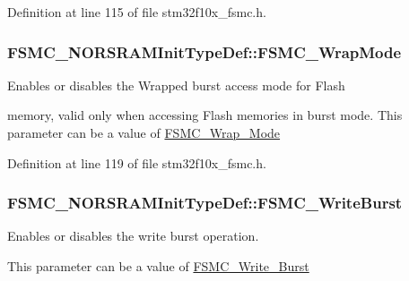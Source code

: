 Definition at line 115 of file stm32f10x\-\_\-fsmc.\-h.

\hypertarget{struct_f_s_m_c___n_o_r_s_r_a_m_init_type_def_a7e201c17bf7c5f6cc69fb6de29c8b024}{
\subsubsection[{F\-S\-M\-C\-\_\-\-Wrap\-Mode}]{ F\-S\-M\-C\-\_\-\-N\-O\-R\-S\-R\-A\-M\-Init\-Type\-Def\-::\-F\-S\-M\-C\-\_\-\-Wrap\-Mode}}\label{struct_f_s_m_c___n_o_r_s_r_a_m_init_type_def_a7e201c17bf7c5f6cc69fb6de29c8b024}
\begin{DoxyVerb}            Enables or disables the Wrapped burst access mode for Flash
\end{DoxyVerb}
 memory, valid only when accessing Flash memories in burst mode. This parameter can be a value of \hyperlink{group___f_s_m_c___wrap___mode}{F\-S\-M\-C\-\_\-\-Wrap\-\_\-\-Mode} 

Definition at line 119 of file stm32f10x\-\_\-fsmc.\-h.

\hypertarget{struct_f_s_m_c___n_o_r_s_r_a_m_init_type_def_adac3756711f2d76e56a8cbcb7a03843d}{
\subsubsection[{F\-S\-M\-C\-\_\-\-Write\-Burst}]{ F\-S\-M\-C\-\_\-\-N\-O\-R\-S\-R\-A\-M\-Init\-Type\-Def\-::\-F\-S\-M\-C\-\_\-\-Write\-Burst}}\label{struct_f_s_m_c___n_o_r_s_r_a_m_init_type_def_adac3756711f2d76e56a8cbcb7a03843d}
\begin{DoxyVerb}          Enables or disables the write burst operation.
\end{DoxyVerb}
 This parameter can be a value of \hyperlink{group___f_s_m_c___write___burst}{F\-S\-M\-C\-\_\-\-Write\-\_\-\-Burst} 

